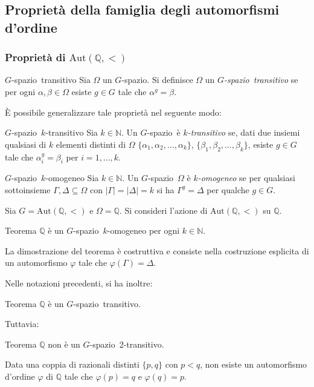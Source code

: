 \documentclass[italian, aspectratio=169,bookmarks=false]{beamer}
\newcommand{\aut}{ \mathrm{Aut} ( \mathbb{Q},< ) } %
\newcommand{\N}{\mathbb{N}} %
\newcommand{\Q}{\mathbb{Q}} %
\newcommand{\0}{\setminus\{0\}} %
\newcommand{\Gsp}{$G$-spazio~} %
\theoremstyle{definition}
\theoremstyle{plain}
\begin{document}
\subsection[Proprietà di $\aut$]{Proprietà della famiglia degli automorfismi d'ordine}
\begin{frame}
    \frametitle{Proprietà di $\aut$}
    \pause
    \begin{block}{\Gsp transitivo}
            Sia $\Omega$ un $G$-spazio. Si definisce $\Omega$ un \emph{\Gsp transitivo} se per ogni $\alpha,\beta \in \Omega$ esiste $g \in G$ tale che $\alpha^g=\beta$.
    \end{block} \pause
    \medskip È possibile generalizzare tale proprietà nel seguente modo: \pause
    \medskip
    \begin{block}{\Gsp $k$-transitivo}
        Sia $k \in \N$. Un \Gsp è \emph{$k$-transitivo} se, dati due insiemi qualsiasi di $k$ elementi distinti di $\Omega$ $\{\alpha_1,\alpha_2,\dotsc,\alpha_k\}$, $\{\beta_1,\beta_2,\dotsc,\beta_k\}$, esiste $g \in G$ tale che $\alpha_i^g=\beta_i$ per $i=1,\dotsc,k$.
    \end{block}
\end{frame}
\begin{frame}
    \begin{block}{\Gsp $k$-omogeneo}
        Sia $k \in \N$. Un \Gsp $\Omega$ è \emph{$k$-omogeneo} se per qualsiasi sottoinsieme $\Gamma,\Delta \subseteq \Omega$ con $|\Gamma|=|\Delta|=k$ si ha $\Gamma^g=\Delta$ per qualche $g \in G$.
    \end{block} \pause

    \medskip Sia $G=\aut$ e $\Omega=\Q$. Si consideri l'azione di $\aut$ su $\Q$.
    \begin{alertblock}{Teorema}
        $\Q$ è un \Gsp $k$-omogeneo per ogni $k \in \N$.
    \end{alertblock} \pause
    La dimostrazione del teorema è costruttiva e consiste nella costruzione esplicita di un automorfismo $\varphi$ tale che $\varphi(\Gamma)=\Delta$.
\end{frame}
\begin{frame}
    Nelle notazioni precedenti, si ha inoltre:\pause
    \begin{alertblock}{Teorema}
        $\Q$ è un \Gsp transitivo.
    \end{alertblock} \pause
    Tuttavia:
    \begin{alertblock}{Teorema}
        $\Q$ non è un \Gsp 2-transitivo.
    \end{alertblock} \pause
    Data una coppia di razionali distinti $\{p,q\}$ con $p<q$, non esiste un automorfismo d'ordine $\varphi$ di $\Q$ tale che $\varphi(p)=q$ e $\varphi(q)=p$.
\end{frame}
\end{document}
